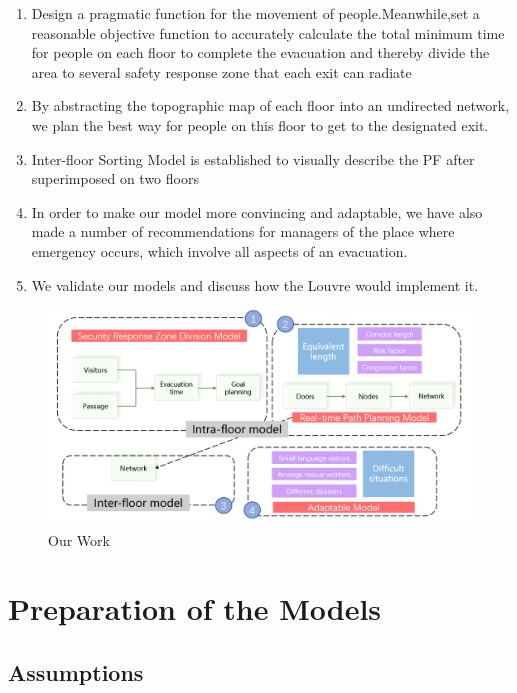 \begin{enumerate}
    \item Design a pragmatic function for the movement of people.Meanwhile,set a reasonable objective function to accurately calculate the total minimum time for people on each floor to complete the evacuation and thereby divide the area to several safety response zone that each exit can radiate
    \item By abstracting the topographic map of each floor into an undirected network, we plan the best way for people on this floor to get to the designated exit.
    \item  Inter-floor Sorting Model is established to visually describe the PF after superimposed on two floors
    \item In order to make our model more convincing and adaptable, we have also made a number of recommendations for managers of the place where emergency occurs, which involve all aspects of an evacuation.
    \item We validate our models and discuss how the Louvre would implement it.
\end{enumerate}

\begin{figure}[H]
    \centering
    \includegraphics[scale=0.7]{all.png}
    \caption{Our Work}
    \label{all}
\end{figure}

\section{Preparation of the Models}
\subsection{Assumptions}

